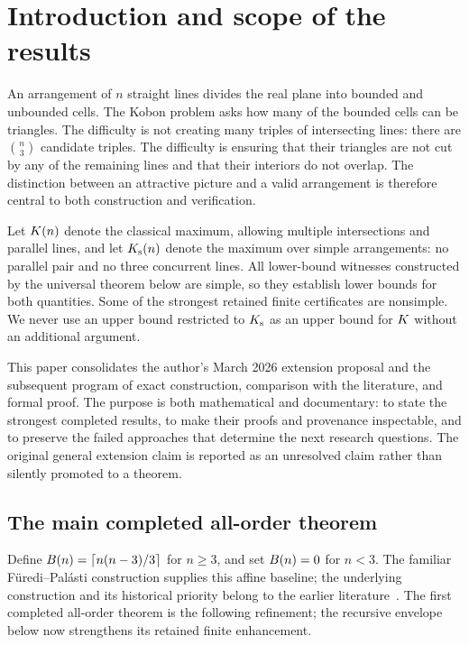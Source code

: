 \section{Introduction and scope of the results}\label{sec:introduction}

An arrangement of $n$ straight lines divides the real plane into bounded and unbounded cells. The Kobon problem asks how many of the bounded cells can be triangles. The difficulty is not creating many triples of intersecting lines: there are $\binom n3$ candidate triples. The difficulty is ensuring that their triangles are not cut by any of the remaining lines and that their interiors do not overlap. The distinction between an attractive picture and a valid arrangement is therefore central to both construction and verification.

Let $K(n)$ denote the classical maximum, allowing multiple intersections and parallel lines, and let $K_{\mathrm{s}}(n)$ denote the maximum over simple arrangements: no parallel pair and no three concurrent lines. All lower-bound witnesses constructed by the universal theorem below are simple, so they establish lower bounds for both quantities. Some of the strongest retained finite certificates are nonsimple. We never use an upper bound restricted to $K_{\mathrm{s}}$ as an upper bound for $K$ without an additional argument.

This paper consolidates the author's March 2026 extension proposal and the subsequent program of exact construction, comparison with the literature, and formal proof. The purpose is both mathematical and documentary: to state the strongest completed results, to make their proofs and provenance inspectable, and to preserve the failed approaches that determine the next research questions. The original general extension claim is reported as an unresolved claim rather than silently promoted to a theorem.

\subsection{The main completed all-order theorem}

Define $B(n)=\left\lceil n(n-3)/3\right\rceil$ for $n\ge3$, and set $B(n)=0$ for $n<3$. The familiar F\"uredi--Pal\'asti construction supplies this affine baseline; the underlying construction and its historical priority belong to the earlier literature~\cite{furedipalasti1984,erickson1999}. The first completed all-order theorem is the following refinement; the recursive envelope below now strengthens its retained finite enhancement.

